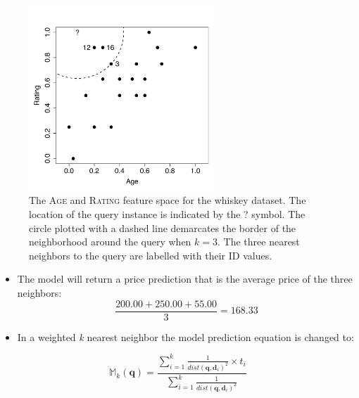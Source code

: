 \documentclass[xcolor={table}]{beamer}
\newcommand{\featN}[1]{\textsc{#1}}
\begin{document}
 \begin{frame} [plain]
\begin{figure}[htb]
	\begin{center}
	\includegraphics[width=0.62\textwidth]{./images/whiskey_fs.pdf}
	\end{center}
	\caption{The \featN{Age} and \featN{Rating} feature space for the whiskey dataset. The location of the query instance is indicated by the ? symbol. The circle plotted with a dashed line demarcates the border of the neighborhood around the query when $k=3$. The three nearest neighbors to the query are labelled with their \featN{ID} values.}
	\label{fig:whiskeyfs}
\end{figure}
\end{frame} 

 \begin{frame} 
 \begin{itemize}
\item The model will return a price prediction that is the average price of the three neighbors:
\begin{equation*}
\frac{200.00+250.00+55.00}{3}=168.33
\label{eq:whiskypricepred}
\end{equation*}
\end{itemize}
\end{frame} 


 \begin{frame} 
\begin{itemize}
	\item In a  \alert{weighted \textit{k} nearest neighbor} the model prediction equation is changed to:
\end{itemize}
\begin{equation}
\mathbb{M}_{k}(\mathbf{q}) =\frac{\displaystyle\sum_{i=1}^k \displaystyle \frac{1}{dist(\mathbf{q},\mathbf{d}_i)^2} \times t_i}{\displaystyle\sum_{i=1}^k \displaystyle \frac{1}{dist(\mathbf{q},\mathbf{d}_i)^2}} 
\label{eq:weightedknnreg}
\end{equation}
\end{frame} 
\end{document}
